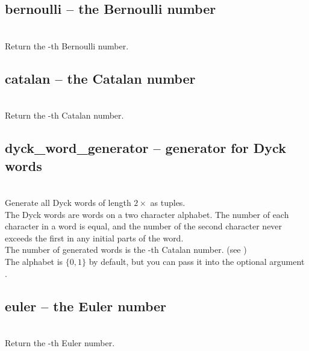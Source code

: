   \subsection{bernoulli -- the Bernoulli number}
   \\
   \spacing
   \quad Return the -th Bernoulli number.\\

  \subsection{catalan -- the Catalan number}
   \\
   \spacing
   \quad Return the -th Catalan number.\\

  \subsection{dyck\_word\_generator -- generator for Dyck words}
   \\
   \spacing
   \quad  Generate all Dyck words of length \(2\times\) as tuples.\\
   \spacing
   \quad The Dyck words are words on a two character alphabet.
   The number of each character in a word is equal, 
   and the number of the second character never exceeds the first
   in any initial parts of the word.\\
   \spacing
   \quad The number of generated words is the -th Catalan number.
   (see )\\
   \spacing
   \quad The alphabet is \(\{0, 1\}\) by default, but you can pass it into the
   optional argument .\\

  \subsection{euler -- the Euler number}
   \\
   \spacing
   \quad Return the -th Euler number.\\

